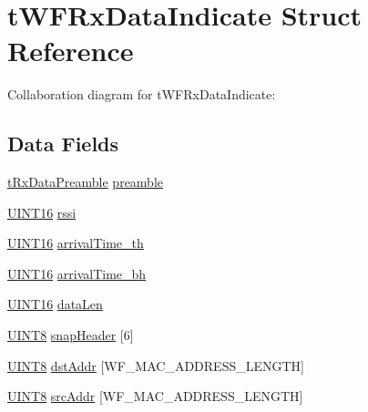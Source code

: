 \hypertarget{structt_w_f_rx_data_indicate}{}\section{t\+W\+F\+Rx\+Data\+Indicate Struct Reference}
\label{structt_w_f_rx_data_indicate}


Collaboration diagram for t\+W\+F\+Rx\+Data\+Indicate\+:
\subsection*{Data Fields}
\begin{DoxyCompactItemize}
\item 
\hyperlink{_w_f_data_tx_rx_8c_ae09877989a8befd79b752cfdeaf91f88}{t\+Rx\+Data\+Preamble} \hyperlink{structt_w_f_rx_data_indicate_a5b64b4a91ade7dc3b8f50370b41beea5}{preamble}
\item 
\hyperlink{_generic_type_defs_8h_acfa284fa8026c4aace2728f7f15d6c13}{U\+I\+N\+T16} \hyperlink{structt_w_f_rx_data_indicate_a640aff00cf10c51413e56e7846dc5089}{rssi}
\item 
\hyperlink{_generic_type_defs_8h_acfa284fa8026c4aace2728f7f15d6c13}{U\+I\+N\+T16} \hyperlink{structt_w_f_rx_data_indicate_a360dd66b759d42b3fb9203f6d6c1bf5a}{arrival\+Time\+\_\+th}
\item 
\hyperlink{_generic_type_defs_8h_acfa284fa8026c4aace2728f7f15d6c13}{U\+I\+N\+T16} \hyperlink{structt_w_f_rx_data_indicate_a50819b6bf8ebd6cb15e7a3958da755b6}{arrival\+Time\+\_\+bh}
\item 
\hyperlink{_generic_type_defs_8h_acfa284fa8026c4aace2728f7f15d6c13}{U\+I\+N\+T16} \hyperlink{structt_w_f_rx_data_indicate_ac4dc0b4aa8bdda79343e9cf4287adbf6}{data\+Len}
\item 
\hyperlink{_generic_type_defs_8h_ab27e9918b538ce9d8ca692479b375b6a}{U\+I\+N\+T8} \hyperlink{structt_w_f_rx_data_indicate_a07518744b6a23e1e00d1439bc5f5f9cf}{snap\+Header} \mbox{[}6\mbox{]}
\item 
\hyperlink{_generic_type_defs_8h_ab27e9918b538ce9d8ca692479b375b6a}{U\+I\+N\+T8} \hyperlink{structt_w_f_rx_data_indicate_ab8a017e9ada48f6b2887e632e5a61b89}{dst\+Addr} \mbox{[}W\+F\+\_\+\+M\+A\+C\+\_\+\+A\+D\+D\+R\+E\+S\+S\+\_\+\+L\+E\+N\+G\+T\+H\mbox{]}
\item 
\hyperlink{_generic_type_defs_8h_ab27e9918b538ce9d8ca692479b375b6a}{U\+I\+N\+T8} \hyperlink{structt_w_f_rx_data_indicate_a01f7d3e001eee39fd30cbee1d63dcae5}{src\+Addr} \mbox{[}W\+F\+\_\+\+M\+A\+C\+\_\+\+A\+D\+D\+R\+E\+S\+S\+\_\+\+L\+E\+N\+G\+T\+H\mbox{]}
\end{DoxyCompactItemize}



